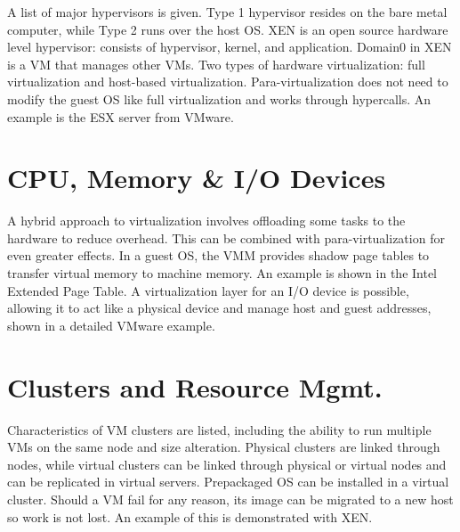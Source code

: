 A list of major hypervisors is given. Type 1 hypervisor resides on the
bare metal computer, while Type 2 runs over the host OS. XEN is an open
source hardware level hypervisor: consists of hypervisor, kernel, and
application. Domain0 in XEN is a VM that manages other VMs. Two types of
hardware virtualization: full virtualization and host-based
virtualization. Para-virtualization does not need to modify the guest OS
like full virtualization and works through hypercalls. An example is the
ESX server from VMware.



\section{CPU, Memory \& I/O Devices}

A hybrid approach to virtualization involves offloading some tasks to
the hardware to reduce overhead. This can be combined with
para-virtualization for even greater effects. In a guest OS, the VMM
provides shadow page tables to transfer virtual memory to machine
memory. An example is shown in the Intel Extended Page Table. A
virtualization layer for an I/O device is possible, allowing it to act
like a physical device and manage host and guest addresses, shown in a
detailed VMware example.



\section{Clusters and Resource Mgmt.}

Characteristics of VM clusters are listed, including the ability to run
multiple VMs on the same node and size alteration. Physical clusters are
linked through nodes, while virtual clusters can be linked through
physical or virtual nodes and can be replicated in virtual servers.
Prepackaged OS can be installed in a virtual cluster. Should a VM fail
for any reason, its image can be migrated to a new host so work is not
lost. An example of this is demonstrated with XEN.

